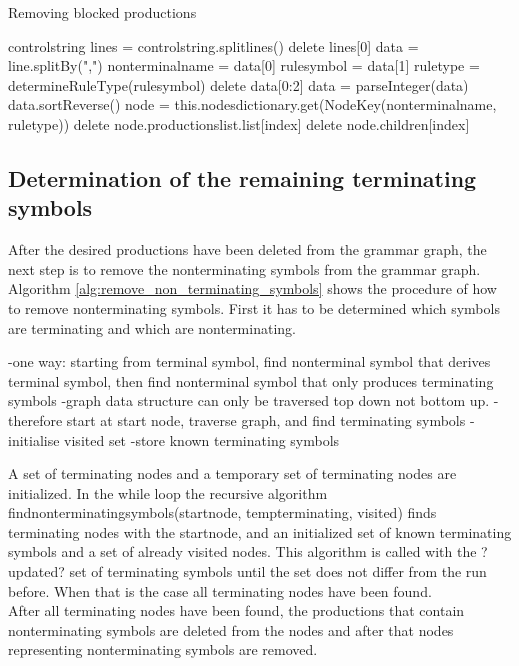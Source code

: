 \begin{algorithm}[H]
\caption{Removing blocked productions}
\begin{algorithmic}[1] 
\Require control\textunderscore string
\State lines = control\textunderscore string.splitlines()
\State delete lines[0]
	\State data = line.splitBy(",")
	\State nonterminal\textunderscore name = data[0]
	\State rule\textunderscore symbol = data[1]
	\State rule\textunderscore type = determineRuleType(rule\textunderscore symbol)
	\State delete data[0:2]
	\State data = parseInteger(data)
	\State data.sortReverse()
	\State node = this.nodes\textunderscore dictionary.get(Node\textunderscore Key(nonterminal\textunderscore name, rule\textunderscore type))
		\State delete node.productions\textunderscore list.list[index]
		\State delete node.children[index]
	\EndFor
\EndFor
\end{algorithmic}
\label{alg:remove_blocked_productions}
\end{algorithm}

\subsection{Determination of the remaining terminating symbols}
After the desired productions have been deleted from the grammar graph, the next step is to remove the nonterminating symbols from the grammar graph. Algorithm \ref{alg:remove_non_terminating_symbols} shows the procedure of how to remove nonterminating symbols.
First it has to be determined which symbols are terminating and which are nonterminating.

-one way: starting from terminal symbol, find nonterminal symbol that derives terminal symbol, then find nonterminal symbol that only produces terminating symbols
-graph data structure can only be traversed top down not bottom up.
-therefore start at start node, traverse graph, and find terminating symbols
-initialise visited set
-store known terminating symbols

A set of terminating nodes and a temporary set of terminating nodes are initialized.
In the while loop the recursive algorithm find\textunderscore non\textunderscore terminating\textunderscore symbols(start\textunderscore node, temp\textunderscore terminating, visited) finds terminating nodes with the start\textunderscore node, and an initialized set of known terminating symbols and a set of already visited nodes.
This algorithm is called with the ?updated? set of terminating symbols until the set does not differ from the run before.
When that is the case all terminating nodes have been found.\\
After all terminating nodes have been found, the productions that contain nonterminating symbols are deleted from the nodes and after that nodes representing nonterminating symbols are removed.

